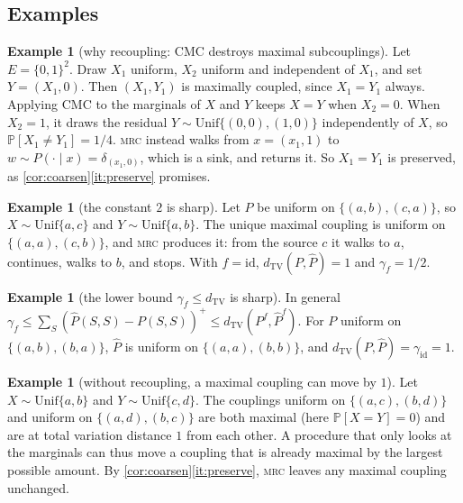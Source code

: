 \documentclass[11pt]{article}
\theoremstyle{definition}
\newtheorem{example}[theorem]{Example}
\newcommand{\hP}{\hat P}
\newcommand{\TV}{d_{\mathrm{TV}}}
\newcommand{\pos}[1]{\left(#1\right)^{+}}
\newcommand{\MRC}{\textnormal{\textsc{mrc}}}
\renewcommand{\Pr}{\mathbb{P}}
\begin{document}
\subsection{Examples}

\begin{example}[why recoupling: CMC destroys maximal subcouplings]\label{ex:why}
Let $E=\{0,1\}^2$. Draw $X_1$ uniform, $X_2$ uniform and independent of $X_1$,
and set $Y=(X_1,0)$. Then $(X_1,Y_1)$ is maximally coupled, since $X_1=Y_1$
always. Applying CMC to the marginals of $X$ and $Y$ keeps $X=Y$ when $X_2=0$.
When $X_2=1$, it draws the residual $Y\sim\mathrm{Unif}\{(0,0),(1,0)\}$
independently of $X$, so $\Pr[X_1\neq Y_1]=1/4$. \MRC{} instead walks from
$x=(x_1,1)$ to $w\sim P(\cdot\mid x)=\delta_{(x_1,0)}$, which is a sink, and
returns it. So $X_1=Y_1$ is preserved, as \cref{cor:coarsen}\ref{it:preserve}
promises.
\end{example}

\begin{example}[the constant $2$ is sharp]\label{ex:tight2}
Let $P$ be uniform on $\{(a,b),(c,a)\}$, so $X\sim\mathrm{Unif}\{a,c\}$ and
$Y\sim\mathrm{Unif}\{a,b\}$. The unique maximal coupling is uniform on
$\{(a,a),(c,b)\}$, and \MRC{} produces it: from the source $c$ it walks to $a$,
continues, walks to $b$, and stops. With $f=\mathrm{id}$,
$\TV(P,\hP)=1$ and $\gamma_f=1/2$.
\end{example}

\begin{example}[the lower bound $\gamma_f\le\TV$ is sharp]\label{ex:tight1}
In general $\gamma_f\le\sum_S\pos{\hP(S,S)-P(S,S)}\le\TV(P^f,\hP^f)$. For $P$
uniform on $\{(a,b),(b,a)\}$, $\hP$ is uniform on $\{(a,a),(b,b)\}$, and
$\TV(P,\hP)=\gamma_{\mathrm{id}}=1$.
\end{example}

\begin{example}[without recoupling, a maximal coupling can move by $1$]\label{ex:move}
Let $X\sim\mathrm{Unif}\{a,b\}$ and $Y\sim\mathrm{Unif}\{c,d\}$. The couplings
uniform on $\{(a,c),(b,d)\}$ and uniform on $\{(a,d),(b,c)\}$ are both maximal
(here $\Pr[X=Y]=0$) and are at total variation distance $1$ from each other. A
procedure that only looks at the marginals can thus move a coupling that is
already maximal by the largest possible amount. By
\cref{cor:coarsen}\ref{it:preserve}, \MRC{} leaves any maximal coupling unchanged.
\end{example}
\end{document}
